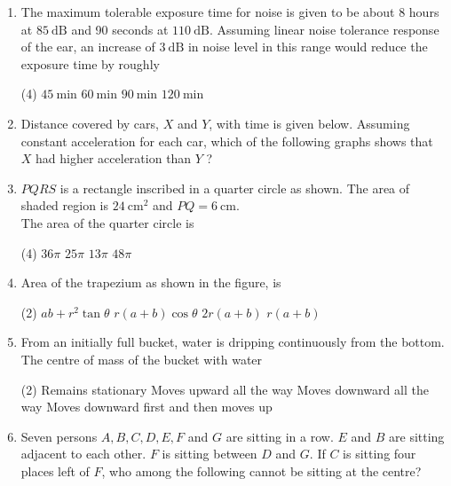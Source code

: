 \begin{enumerate}
\begin{tasks}
\end{tasks}
\item The maximum tolerable exposure time for noise is given to be about 8 hours at $85 \mathrm{~dB}$ and 90 seconds at $110 \mathrm{~dB}$. Assuming linear noise tolerance response of the ear, an increase of $3 \mathrm{~dB}$ in noise level in this range would reduce the exposure time by roughly
 \begin{tasks}(4)
	\task[\textbf{a.}]$45 \mathrm{~min}$
	\task[\textbf{b.}]$60 \mathrm{~min}$
	\task[\textbf{c.}]$90 \mathrm{~min}$
	\task[\textbf{d.}]$120 \mathrm{~min}$ 
\end{tasks}
\item Distance covered by cars, $X$ and $Y$, with time is given below. Assuming constant acceleration for each car, which of the following graphs shows that $X$ had higher acceleration than $Y$ ?
\item  $P Q R S$ is a rectangle inscribed in a quarter circle as shown. The area of shaded region is $24 \mathrm{~cm}^{2}$
and $P Q=6 \mathrm{~cm}$.	\\
The area of the quarter circle is
	 \begin{tasks}(4)
		\task[\textbf{a.}]$36 \pi$
		\task[\textbf{b.}]$25 \pi$
		\task[\textbf{c.}] $13 \pi$
		\task[\textbf{d.}] $48 \pi$
	\end{tasks}
\item Area of the trapezium as shown in the figure, is	\\
 \begin{tasks}(2)
	\task[\textbf{a.}]$a b+r^{2} \tan \theta$
	\task[\textbf{b.}]$r(a+b) \cos \theta$
	\task[\textbf{c.}]$2 r(a+b)$
	\task[\textbf{d.}] $r(a+b)$
\end{tasks}
\item From an initially full bucket, water is dripping continuously from the bottom. The centre of mass of the bucket with water
 \begin{tasks}(2)
	\task[\textbf{a.}]Remains stationary
	\task[\textbf{b.}]Moves upward all the way
	\task[\textbf{c.}]Moves downward all the way
	\task[\textbf{d.}]Moves downward first and then moves up
\end{tasks}
\item Seven persons $A, B, C, D, E, F$ and $G$ are sitting in a row. $E$ and $B$ are sitting adjacent to each other. $F$ is sitting between $D$ and $G$. If $C$ is sitting four places left of $F$, who among the following cannot be sitting at the centre?

\end{enumerate}
